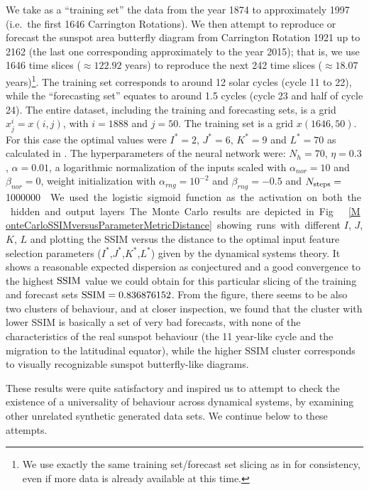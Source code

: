 \documentclass[journal]{IEEEtran}
\begin{document}
We take as a ``training set'' the data from the year 1874 to 
approximately 1997 (i.e.\ the first 1646 Carrington Rotations). We then attempt to reproduce or forecast the sunspot area butterfly 
diagram from Carrington Rotation 1921 up to 2162 (the last one corresponding approximately to the year 2015); that is, we use 1646 time 
slices ($\approx 122.92$ years) to reproduce the next 242 time slices ($\approx 18.07$ years)\footnote{We use exactly
the same training set/forecast set slicing as in \cite{covas2016,covaspeixinhojoao} for consistency, even if more data is already
available at this time.}. The training set 
corresponds to around 12 solar cycles (cycle 11 to 22), while the ``forecasting set'' equates to around 1.5 cycles 
(cycle 23 and half of cycle 24). The entire dataset, including the training and forecasting sets, is a grid $x^i_j=x(i,j)$, with 
$i=1888$ and $j=50$. The training set is a grid $x(1646,50)$. For this case the optimal values were $I^*=2$, $J^*=6$, $K^*=9$ and 
$L^*=70$ as calculated in \cite{covas2016}. 
The hyperparameters of the neural network were:
$N_h=70$, $\eta=0.3$, $\alpha=0.01$, a logarithmic normalization of the inputs scaled
 with $\alpha_{nor} = 10$ and $\beta_{nor} = 0$, weight initialization with $\alpha_{rng} = 10^{-2}$ and $\beta_{rng} = -0.5$ 
 and $N_{\textnormal{steps}}=$\SI{1000000}\nobreak. We used the logistic sigmoid function as the activation on both the hidden and output layers.

The Monte Carlo results are depicted in Fig.\ \ref{MonteCarloSSIMversusParameterMetricDistance} showing runs with different $I$, $J$, $K$, $L$
and plotting the SSIM versus the distance to the optimal input feature selection parameters ($I^*$,$J^*$,$K^*$,$L^*$) 
given by the dynamical systems theory.  
It shows a reasonable expected dispersion as conjectured and 
a good convergence to the highest $\textnormal{SSIM}$ value we could obtain for this particular slicing of the training and forecast sets 
$\textnormal{SSIM}= 0.836876152$. From the figure, there seems to be also two clusters of behaviour, and at closer inspection, we found that the
cluster with lower SSIM is basically a set of very bad forecasts, with none of the characteristics of the real sunspot behaviour (the 11 year-like cycle
and the migration to the latitudinal equator), while the higher SSIM cluster corresponds to visually recognizable sunspot butterfly-like diagrams.



These results were quite satisfactory and inspired us to attempt to check the existence of a universality of behaviour across
dynamical systems, by examining other unrelated synthetic
generated data sets. We continue below to these attempts.
\end{document}

